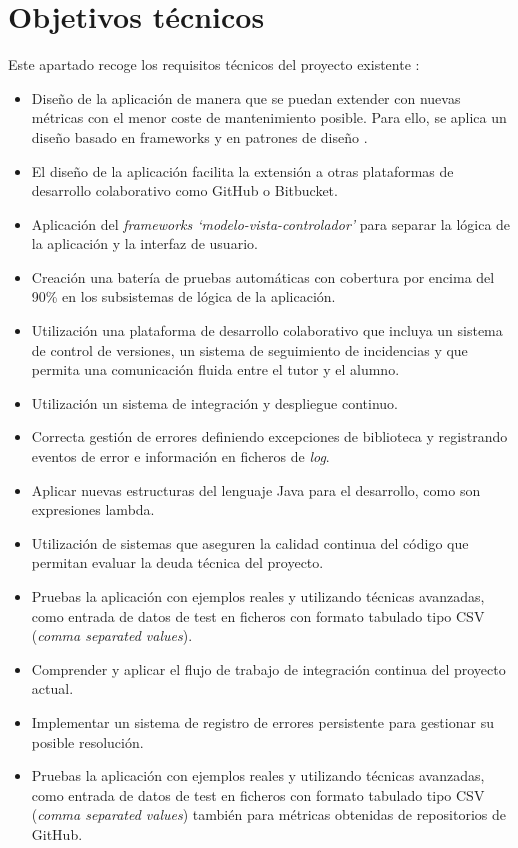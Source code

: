 \section{Objetivos técnicos}
Este apartado recoge los requisitos técnicos del proyecto existente  \cite{TFGPrevio}:
\begin{itemize}
	\tightlist
	\item Diseño de la aplicación de manera que se puedan extender con nuevas métricas con el menor coste de mantenimiento posible. Para ello, se aplica un diseño basado en frameworks y en patrones de diseño \cite{gamma_patrones_2002}.
	\item El diseño de la aplicación facilita la extensión a otras plataformas de desarrollo colaborativo como GitHub o Bitbucket.
	\item Aplicación del \textit{frameworks `modelo-vista-controlador'} para separar la lógica de la aplicación y la interfaz de usuario.
	\item Creación una batería de pruebas automáticas con cobertura por encima del 90\% en los subsistemas de lógica de la aplicación.
	\item Utilización una plataforma de desarrollo colaborativo que incluya un sistema de control de versiones, un sistema de seguimiento de incidencias y que permita una comunicación fluida entre el tutor y el alumno.
	\item Utilización un sistema de integración y despliegue continuo.
	\item Correcta gestión de errores definiendo excepciones de biblioteca y registrando eventos de error e información en ficheros de \textit{log}. 
	\item Aplicar nuevas estructuras  del lenguaje Java para el desarrollo, como son expresiones lambda. 
	\item Utilización de sistemas que aseguren la calidad continua del código que permitan evaluar la deuda técnica del proyecto.
	\item Pruebas la aplicación con ejemplos reales y utilizando técnicas avanzadas, como entrada de datos de test en ficheros con formato tabulado tipo CSV (\textit{comma separated values}).
	\item Comprender y aplicar el flujo de trabajo de integración continua del proyecto actual.
	\item Implementar un sistema de registro de errores persistente para gestionar su posible resolución.
	\item Pruebas la aplicación con ejemplos reales y utilizando técnicas avanzadas, como entrada de datos de test en ficheros con formato tabulado tipo CSV (\textit{comma separated values}) también para métricas obtenidas de repositorios de GitHub. 		
\end{itemize}


